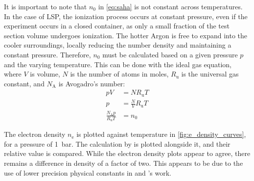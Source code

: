         It is important to note that $n_0$ in \autoref{eq:saha} is not constant across temperatures. In the case of LSP, the ionization process occurs at constant pressure, even if the experiment occurs in a closed container, as only a small fraction of the test section volume undergoes ionization. The hotter Argon is free to expand into the cooler surroundings, locally reducing the number density and maintaining a constant pressure. Therefore, $n_0$ must be calculated based on a given pressure $p$ and the varying temperature. This can be done with the ideal gas equation, where $V$ is volume, $N$ is the number of atoms in moles, $R_\mathrm{u}$ is the universal gas constant, and $N_\mathrm{A}$ is Avogadro's number:
        \begin{align*}
            pV&= NR_\mathrm{u}T \\
            p&= \frac{N}{V}R_\mathrm{u}T \\
            \frac{N_\mathrm{A}p}{R_\mathrm{u}T}&= n_0
        \end{align*}

        The electron density $n_\mathrm{e}$ is plotted against temperature in \autoref{fig:e_density_curves}, for a pressure of \qty{1}{bar}. The calculation by \citeauthor{nassarInvestigationLasersustainedPlasma2012} is plotted alongside it, and their relative value is compared. While the electron density plots appear to agree, there remains a difference in density of a factor of two. This appears to be due to the use of lower precision physical constants in \citeauthor{akarapuNumericalModelLasersustained2009} and \citeauthor{nassarInvestigationLasersustainedPlasma2012}'s work.

